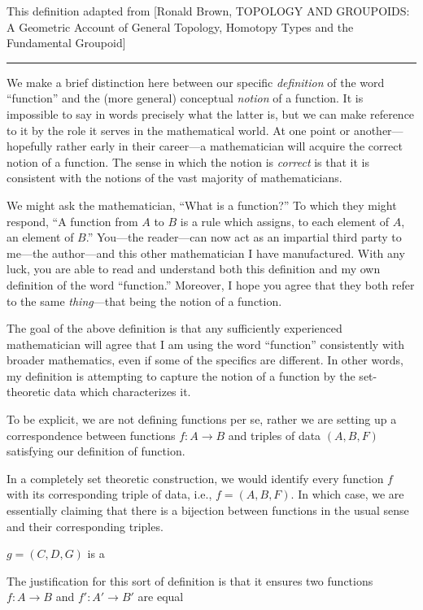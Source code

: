 \documentclass[12pt]{article}
\newcommand{\sepline}{\rule{\textwidth}{0.4pt}}
\theoremstyle{definition}
\newcommand{\<}{\left\langle}
\renewcommand{\>}{\right\rangle}
\begin{document}
This definition adapted from [Ronald Brown, TOPOLOGY AND
GROUPOIDS: A Geometric Account of General Topology,
Homotopy Types and the Fundamental Groupoid]

\sepline

We make a brief distinction here between our specific \emph{definition} of the word ``function'' and the (more general) conceptual \emph{notion} of a function.
It is impossible to say in words precisely what the latter is, but we can make reference to it by the role it serves in the mathematical world.
At one point or another---hopefully rather early in their career---a mathematician will acquire the correct notion of a function.
The sense in which the notion is \emph{correct} is that it is consistent with the notions of the vast majority of mathematicians.


We might ask the mathematician, ``What is a function?''
To which they might respond, ``A function from $A$ to $B$ is a rule which assigns, to each element of $A$, an element of $B$.''
You---the reader---can now act as an impartial third party to me---the author---and this other mathematician I have manufactured.
With any luck, you are able to read and understand both this definition and my own definition of the word ``function.''
Moreover, I hope you agree that they both refer to the same \emph{thing}---that being the notion of a function.


The goal of the above definition is that any sufficiently experienced mathematician will agree that I am using the word ``function'' consistently with broader mathematics, even if some of the specifics are different.
In other words, my definition is attempting to capture the notion of a function by the set-theoretic data which characterizes it.


To be explicit, we are not defining functions per se, rather we are setting up a correspondence between functions $f : A \to B$ and triples of data $(A, B, F)$ satisfying our definition of function.

In a completely set theoretic construction, we would identify every function $f$ with its corresponding triple of data, i.e., $f = (A, B, F)$.
In which case, we are essentially claiming that there is a bijection between functions in the usual sense and their corresponding triples.

$g = (C, D, G)$ is a 


The justification for this sort of definition is that it ensures two functions $f : A \to B$ and $f' : A' \to B'$ are equal
\end{document}
